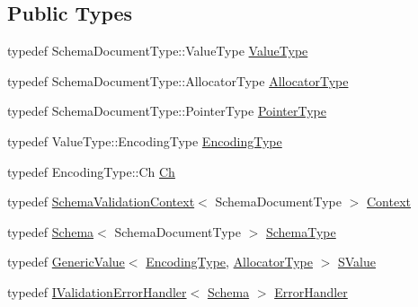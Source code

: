 \subsection*{Public Types}
\begin{DoxyCompactItemize}
\item 
typedef Schema\+Document\+Type\+::\+Value\+Type \mbox{\hyperlink{classrapidjson_1_1internal_1_1_schema_a3979a9083c598195927c08c6e3ba91d1}{Value\+Type}}
\item 
typedef Schema\+Document\+Type\+::\+Allocator\+Type \mbox{\hyperlink{classrapidjson_1_1internal_1_1_schema_aaca940c164d906fdbf504f562bb2f956}{Allocator\+Type}}
\item 
typedef Schema\+Document\+Type\+::\+Pointer\+Type \mbox{\hyperlink{classrapidjson_1_1internal_1_1_schema_aa54c71c41aa8a9091565d12ffe27627c}{Pointer\+Type}}
\item 
typedef Value\+Type\+::\+Encoding\+Type \mbox{\hyperlink{classrapidjson_1_1internal_1_1_schema_a39c052d3d1c7431fefc228c1007d0ecb}{Encoding\+Type}}
\item 
typedef Encoding\+Type\+::\+Ch \mbox{\hyperlink{classrapidjson_1_1internal_1_1_schema_ab9093cbc42067b8e1d3745eafe096ab3}{Ch}}
\item 
typedef \mbox{\hyperlink{structrapidjson_1_1internal_1_1_schema_validation_context}{Schema\+Validation\+Context}}$<$ Schema\+Document\+Type $>$ \mbox{\hyperlink{classrapidjson_1_1internal_1_1_schema_afca06b1f51d1bc18403bdf3f4d55ffef}{Context}}
\item 
typedef \mbox{\hyperlink{classrapidjson_1_1internal_1_1_schema}{Schema}}$<$ Schema\+Document\+Type $>$ \mbox{\hyperlink{classrapidjson_1_1internal_1_1_schema_a62e03be17971648a9d614244ffcb0f10}{Schema\+Type}}
\item 
typedef \mbox{\hyperlink{classrapidjson_1_1_generic_value}{Generic\+Value}}$<$ \mbox{\hyperlink{classrapidjson_1_1internal_1_1_schema_a39c052d3d1c7431fefc228c1007d0ecb}{Encoding\+Type}}, \mbox{\hyperlink{classrapidjson_1_1internal_1_1_schema_aaca940c164d906fdbf504f562bb2f956}{Allocator\+Type}} $>$ \mbox{\hyperlink{classrapidjson_1_1internal_1_1_schema_a9f716b06fc542c4cdb7d8d5cf463bf79}{S\+Value}}
\item 
typedef \mbox{\hyperlink{classrapidjson_1_1internal_1_1_i_validation_error_handler}{I\+Validation\+Error\+Handler}}$<$ \mbox{\hyperlink{classrapidjson_1_1internal_1_1_schema}{Schema}} $>$ \mbox{\hyperlink{classrapidjson_1_1internal_1_1_schema_ab10ebd341d1058236e9aac64cf2cb1eb}{Error\+Handler}}
\end{DoxyCompactItemize}
